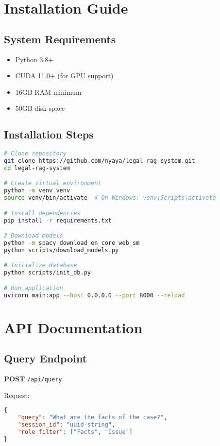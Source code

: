 \documentclass[12pt,a4paper]{article}
\newcommand{\code}[1]{\texttt{#1}}
\begin{document}
\appendix

\section{Installation Guide}

\subsection{System Requirements}

\begin{itemize}
    \item Python 3.8+
    \item CUDA 11.0+ (for GPU support)
    \item 16GB RAM minimum
    \item 50GB disk space
\end{itemize}

\subsection{Installation Steps}

\begin{lstlisting}[language=bash, caption={Installation Commands}]
# Clone repository
git clone https://github.com/nyaya/legal-rag-system.git
cd legal-rag-system

# Create virtual environment
python -m venv venv
source venv/bin/activate  # On Windows: venv\Scripts\activate

# Install dependencies
pip install -r requirements.txt

# Download models
python -m spacy download en_core_web_sm
python scripts/download_models.py

# Initialize database
python scripts/init_db.py

# Run application
uvicorn main:app --host 0.0.0.0 --port 8000 --reload
\end{lstlisting}

\section{API Documentation}

\subsection{Query Endpoint}

\textbf{POST} \code{/api/query}

Request:
\begin{lstlisting}[language=json]
{
    "query": "What are the facts of the case?",
    "session_id": "uuid-string",
    "role_filter": ["Facts", "Issue"]
}
\end{lstlisting}
\end{document}
